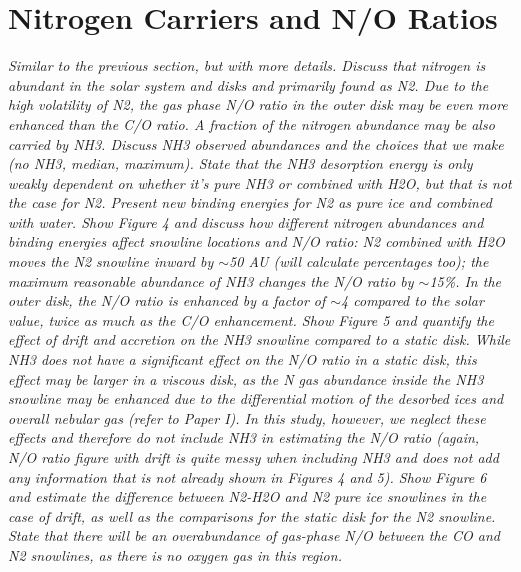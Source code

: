 \documentclass[apj]{emulateapj}
\newcommand{\emgr}[1]{\emph{ \color{gray} #1}}
\begin{document}
\section{Nitrogen Carriers and N/O Ratios}

\emgr{Similar to the previous section, but with more details. Discuss that nitrogen is abundant in the solar system and disks and primarily found as N2. Due to the high volatility of N2, the gas phase N/O ratio in the outer disk may be even more enhanced than the C/O ratio. A fraction of the nitrogen abundance may be also carried by NH3. Discuss NH3 observed abundances and the choices that we make (no NH3, median, maximum). State that the NH3 desorption energy is only weakly dependent on whether it's pure NH3 or combined with H2O, but that is not the case for N2. Present new binding energies for N2 as pure ice and combined with water. Show Figure 4 and discuss how different nitrogen abundances and binding energies affect snowline locations and N/O ratio: N2 combined with H2O moves the N2 snowline inward by $\sim$50 AU (will calculate percentages too); the maximum reasonable abundance of NH3 changes the N/O ratio by $\sim$15\%. In the outer disk, the N/O ratio is enhanced by a factor of $\sim$4 compared to the solar value, twice as much as the C/O enhancement. Show Figure 5 and quantify the effect of drift and accretion on the NH3 snowline compared to a static disk. While NH3 does not have a significant effect on the N/O ratio in a static disk, this effect may be larger in a viscous disk, as the N gas abundance inside the NH3 snowline may be enhanced due to the differential motion of the desorbed ices and overall nebular gas (refer to Paper I). In this study, however, we neglect these effects and therefore do not include NH3 in estimating the N/O ratio (again, N/O ratio figure with drift is quite messy when including NH3 and does not add any information that is not already shown in Figures 4 and 5). Show Figure 6 and estimate the difference between N2-H2O and N2 pure ice snowlines in the case of drift, as well as the comparisons for the static disk for the N2 snowline. State that there will be an overabundance of gas-phase N/O between the CO and N2 snowlines, as there is no oxygen gas in this region.}
\end{document}
